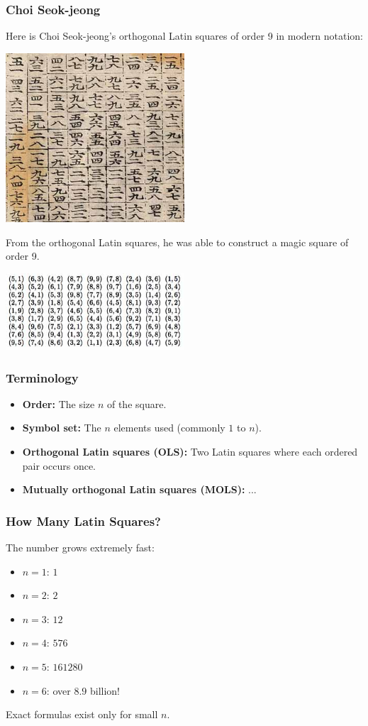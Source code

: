 \documentclass{beamer}
\begin{document}
\begin{frame}
\frametitle{Choi Seok-jeong}
Here is Choi Seok-jeong's orthogonal Latin squares of order 9 in modern notation:

\includegraphics[width=0.5\textwidth]{img10}

From the orthogonal Latin squares, he was able to construct a magic square of order 9.

\includegraphics[width=0.5\textwidth]{img11}
\end{frame}

\begin{frame}
\frametitle{Terminology}
\begin{itemize}
  \item \textbf{Order:} The size $n$ of the square.
  \item \textbf{Symbol set:} The $n$ elements used (commonly $1$ to $n$).
  \item \textbf{Orthogonal Latin squares (OLS):} Two Latin squares where each ordered pair occurs once.
  \item \textbf{Mutually orthogonal Latin squares (MOLS):} ...
\end{itemize}
\end{frame}

\begin{frame}
\frametitle{How Many Latin Squares?}
The number grows extremely fast:
\begin{itemize}
  \item $n = 1$: $1$
  \item $n = 2$: $2$
  \item $n = 3$: $12$
  \item $n = 4$: $576$
  \item $n = 5$: $161280$
  \item $n = 6$: over $8.9$ billion!
\end{itemize}
\pause
Exact formulas exist only for small $n$.
\end{frame}
\end{document}
